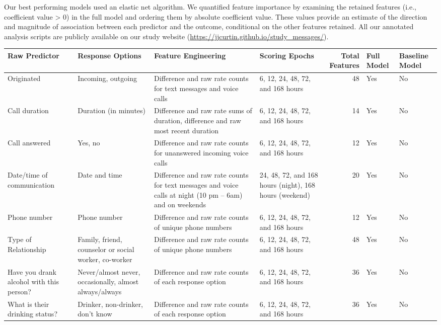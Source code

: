 \documentclass[
  letterpaper,
  DIV=11,
  numbers=noendperiod]{scrartcl}
\begin{document}
Our best performing models used an elastic net algorithm. We quantified
feature importance by examining the retained features (i.e., coefficient
value \textgreater{} 0) in the full model and ordering them by absolute
coefficient value. These values provide an estimate of the direction and
magnitude of association between each predictor and the outcome,
conditional on the other features retained. All our annotated analysis
scripts are publicly available on our study website
(\url{https://jjcurtin.github.io/study_messages/}).

\begin{longtable}[]{@{}llllrll@{}}

\toprule\noalign{}
Raw Predictor & Response Options & Feature Engineering & Scoring Epochs
& Total Features & Full Model & Baseline Model \\
\midrule\noalign{}
\endhead
\bottomrule\noalign{}
\endlastfoot
Originated & Incoming, outgoing & Difference and raw rate counts for
text messages and voice calls & 6, 12, 24, 48, 72, and 168 hours & 48 &
Yes & No \\
Call duration & Duration (in minutes) & Difference and raw rate sums of
duration, difference and raw most recent duration & 6, 12, 24, 48, 72,
and 168 hours & 14 & Yes & No \\
Call answered & Yes, no & Difference and raw rate counts for unanswered
incoming voice calls & 6, 12, 24, 48, 72, and 168 hours & 12 & Yes &
No \\
Date/time of communication & Date and time & Difference and raw rate
counts for text messages and voice calls at night (10 pm -- 6am) and on
weekends & 24, 48, 72, and 168 hours (night), 168 hours (weekend) & 20 &
Yes & No \\
Phone number & Phone number & Difference and raw rate counts of unique
phone numbers & 6, 12, 24, 48, 72, and 168 hours & 12 & Yes & No \\
Type of Relationship & Family, friend, counselor or social worker,
co-worker & Difference and raw rate counts of unique phone numbers & 6,
12, 24, 48, 72, and 168 hours & 48 & Yes & No \\
Have you drank alcohol with this person? & Never/almost never,
occasionally, almost always/always & Difference and raw rate counts of
each response option & 6, 12, 24, 48, 72, and 168 hours & 36 & Yes &
No \\
What is their drinking status? & Drinker, non-drinker, don't know &
Difference and raw rate counts of each response option & 6, 12, 24, 48,
72, and 168 hours & 36 & Yes & No \\

\end{longtable}
\end{document}
